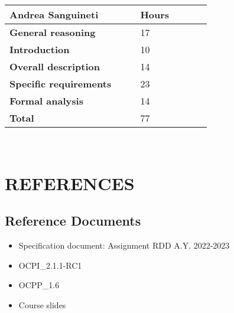 \begin{table}[H]
\centering 
    \begin{tabular}{| p{0.55\linewidth} | p{0.30\linewidth} |}
    \hline
    \rowcolor{bluepoli!40}
    \textbf{Andrea Sanguineti} & \textbf{Hours}\T\B \\    
    \hline \hline
    \textbf{General reasoning} & 17 \T\B \\
    \hline 
    \textbf{Introduction} & 10 \T\B \\
    \hline 
    \textbf{Overall description} & 14 \T\B \\
    \hline 
    \textbf{Specific requirements} & 23 \T\B \\
    \hline 
    \textbf{Formal analysis} & 14 \T\B \\
    \hline
    \textbf{Total} & 77 \T\B \\
    \hline
    \end{tabular}
    \\[10pt]
\end{table}

\restoregeometry
\chapter{REFERENCES}
\label{ch:references}%
\section{Reference Documents}
\begin{itemize}
  \item Specification document: Assignment RDD A.Y. 2022-2023
  \item OCPI\_2.1.1-RC1
  \item OCPP\_1.6
  \item Course slides
\end{itemize}

